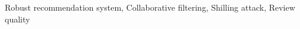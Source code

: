 \documentclass[master,english,final]{kaist-ucs}
\begin{document}
\begin{abstract}


    \end{abstract}

    \begin{Engkeyword}
    Robust recommendation system, Collaborative filtering, Shilling attack, Review quality
    \end{Engkeyword}
\end{document}
